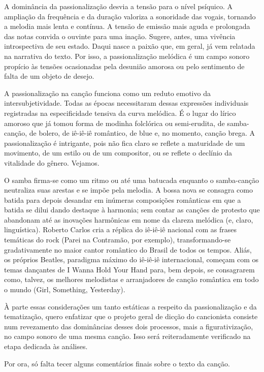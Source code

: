 A dominância da passionalização desvia a tensão para o nível psíquico. A
ampliação da frequência e da duração valoriza a sonoridade das vogais,
tornando a melodia mais lenta e contínua. A tensão de emissão mais aguda
e prolongada das notas convida o ouvinte para uma inação. Sugere, antes,
uma vivência introspectiva de seu estado. Daqui nasce a paixão que, em
geral, já vem relatada na narrativa do texto. Por isso, a
passionalização melódica é um campo sonoro propício às tensões
ocasionadas pela desunião amorosa ou pelo sentimento de falta de um
objeto de desejo.

A passionalização na canção funciona como um reduto emotivo da
intersubjetividade. Todas as épocas necessitaram dessas expressões
individuais registradas na especificidade tensiva da curva melódica. É o
lugar do lírico amoroso que já tomou forma de modinha folclórica ou
semi-erudita, de samba-canção, de bolero, de iê-iê-iê romântico, de blue
e, no momento, canção brega. A passionalização é intrigante, pois não
fica claro se reflete a maturidade de um movimento, de um estilo ou de
um compositor, ou se reflete o declínio da vitalidade do gênero.
Vejamos.~

O samba firma-se como um ritmo ou até uma batucada enquanto o
samba-canção neutraliza suas arestas e se impõe pela melodia. A bossa
nova se consagra como batida para depois desandar em inúmeras
composições românticas em que a batida se dilui dando destaque à
harmonia; sem contar as canções de protesto que abandonam até as
inovações harmônicas em nome da clareza melódica (e, claro,
linguística). Roberto Carlos cria a réplica do iê-iê-iê nacional com as
frases temáticas do rock (Parei na Contramão, por exemplo),
transformando-se gradativamente no maior cantor romântico do Brasil de
todos os tempos. Aliás, os próprios Beatles, paradigma máximo do
iê-iê-iê internacional, começam com os temas dançantes de I Wanna Hold
Your Hand para, bem depois, se consagrarem como, talvez, os melhores
melodistas e arranjadores de canção romântica em todo o mundo (Girl,
Something, Yesterday).

À parte essas considerações um tanto estáticas a respeito da
passionalização e da tematização, quero enfatizar que o projeto geral de
dicção do cancionista consiste num revezamento das dominâncias desses
dois processos, mais a figurativização, no campo sonoro de uma mesma
canção. Isso será reiteradamente verificado na etapa dedicada às
análises.

Por ora, só falta tecer alguns comentários finais sobre o texto da
canção.~

